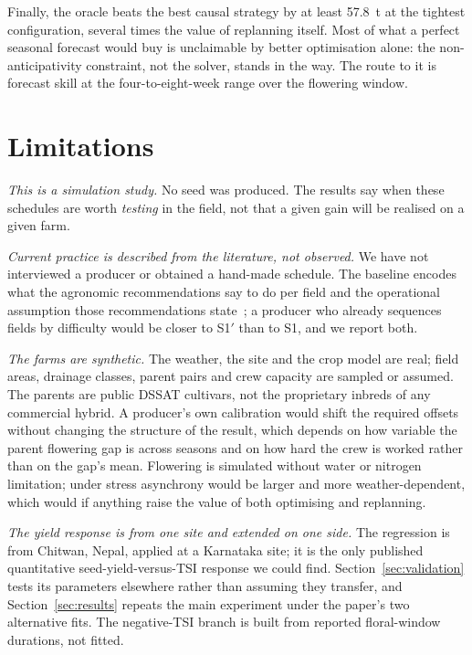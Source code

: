 \documentclass[10pt,twocolumn]{article}
\begin{document}
Finally, the oracle beats the best causal strategy by at least 57.8~t
at the tightest configuration, several times the value of replanning
itself. Most of what a perfect seasonal forecast would buy is
unclaimable by better optimisation alone: the non-anticipativity
constraint, not the solver, stands in the way. The route to it is
forecast skill at the four-to-eight-week range over the flowering
window.


\section{Limitations}
\label{sec:limits}

\emph{This is a simulation study.} No seed was produced. The results say
when these schedules are worth \emph{testing} in the field, not that a given
gain will be realised on a given farm.

\emph{Current practice is described from the literature, not observed.}
We have not interviewed a producer or obtained a hand-made schedule. The
baseline encodes what the agronomic recommendations say to do per field and
the operational assumption those recommendations state~\cite{chassaigne2021};
a producer who already sequences fields by difficulty would be closer to
S1$'$ than to S1, and we report both.

\emph{The farms are synthetic.} The weather, the site and the crop model are
real; field areas, drainage classes, parent pairs and crew capacity are
sampled or assumed. The parents are public DSSAT cultivars, not the
proprietary inbreds of any commercial hybrid. A producer's own calibration
would shift the required offsets without changing the structure of the
result, which depends on how variable the parent flowering gap is across
seasons and on how hard the crew is worked rather than on the gap's mean.
Flowering is simulated without water or nitrogen limitation; under stress
asynchrony would be larger and more weather-dependent, which would if
anything raise the value of both optimising and replanning.

\emph{The yield response is from one site and extended on one side.} The
regression is from Chitwan, Nepal, applied at a Karnataka site; it is the
only published quantitative seed-yield-versus-TSI response we could find.
Section~\ref{sec:validation} tests its parameters elsewhere rather than
assuming they transfer, and Section~\ref{sec:results} repeats the main
experiment under the paper's two alternative fits. The negative-TSI branch
is built from reported floral-window durations, not fitted.
\end{document}
